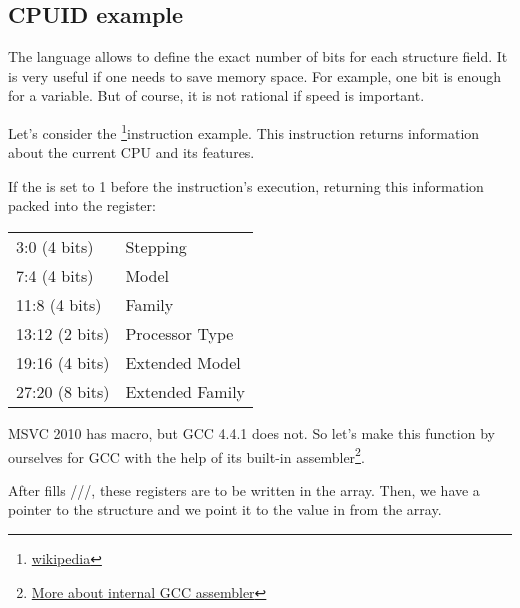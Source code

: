 \subsection{CPUID example}

The \CCpp language allows to define the exact number of bits for each structure field.
It is very useful if one needs to save memory space. 
For example, one bit is enough for a \Tbool variable.
But of course, it is not rational if speed is important.

\newcommand{\FNCPUID}{\footnote{\href{http://go.yurichev.com/17069}{wikipedia}}}

\label{cpuid}

Let's consider the \CPUID\FNCPUID instruction example.
This instruction returns information about the current CPU and its features.

If the \EAX is set to 1 before the instruction's execution, 
\CPUID returning this information packed into the \EAX register:

\begin{center}
\begin{tabular}{ | l | l | }
\hline
3:0 (4 bits)& Stepping \\
7:4 (4 bits) & Model \\
11:8 (4 bits) & Family \\
13:12 (2 bits) & Processor Type \\
19:16 (4 bits) & Extended Model \\
27:20 (8 bits) & Extended Family \\
\hline
\end{tabular}
\end{center}

\newcommand{\FNGCCAS}{\footnote{\href{http://go.yurichev.com/17070}
{More about internal GCC assembler}}}

MSVC 2010 has \CPUID macro, but GCC 4.4.1 does not.
So let's make this function by ourselves for GCC with the help of its built-in assembler\FNGCCAS.



After \CPUID fills \EAX/\EBX/\ECX/\EDX, these registers are to be written in the  array.
Then, we have a pointer to the  structure and we point it to the value in \EAX from the  array.

